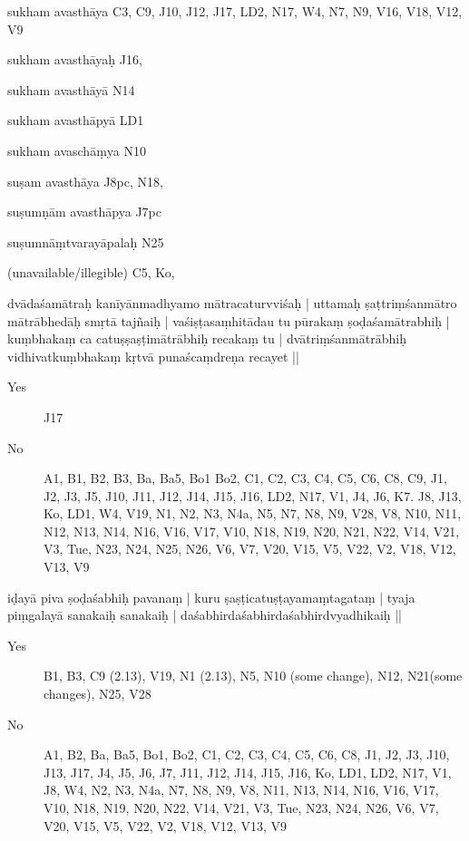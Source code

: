 \begin{ekdosis}
\begin{marma}[hp01_055]
\begin{marma}[hp02_006]
\item[sukham avasthāya] C3, C9, J10, J12, J17, LD2, N17, W4, N7, N9, V16, V18, V12, V9
\item[sukham avasthāyaḥ] J16,
\item[sukham avasthāyā] N14
\item[sukham avasthāpyā] LD1
\item[sukham avaschāṃya] N10
\item[suṣam avasthāya] J8pc, N18,
\item[suṣumṇām avasthāpya] J7pc
\item[suṣumnāṃtvarayāpalaḥ] N25
\item[(unavailable/illegible)] C5, Ko, 

 \begin{description}

        \end{description}
\end{marma}


\begin{marma}[hp02_009]
dvādaśamātraḥ kanīyānmadhyamo mātracaturvviśaḥ |
uttamaḥ ṣaṭtriṃśanmātro mātrābhedāḥ smṛtā tajñaiḥ |
vaśiṣṭasaṃhitādau tu pūrakaṃ ṣoḍaśamātrabhiḥ |
kuṃbhakaṃ ca catuṣṣaṣṭimātrābhiḥ recakaṃ tu |
dvātriṃśanmātrābhiḥ vidhivatkuṃbhakaṃ kṛtvā punaścaṃdreṇa recayet ||
\begin{description}
\item[Yes] J17
\item[No] A1, B1, B2, B3, Ba, Ba5, Bo1 Bo2, C1, C2, C3, C4, C5, C6, C8, C9, J1, J2, J3, J5, J10, J11, J12, J14, J15, J16, LD2, N17, V1, J4, J6, K7. J8, J13, Ko, LD1, W4, V19, N1, N2, N3, N4a, N5, N7, N8, N9, V28, V8, N10, N11, N12, N13, N14, N16, V16, V17, V10, N18, N19, N20, N21, N22, V14, V21, V3, Tue, N23, N24, N25, N26, V6, V7, V20, V15, V5, V22, V2, V18, V12, V13, V9
        \end{description}

\begin{marma}[hp02_011]
iḍayā piva ṣoḍaśabhiḥ pavanaṃ |
kuru ṣaṣṭicatuṣṭayamaṃtagataṃ |
tyaja piṃgalayā sanakaiḥ sanakaiḥ |
daśabhirdaśabhirdaśabhirdvyadhikaiḥ ||
\begin{description}
\item[Yes] B1, B3, C9 (2.13), V19, N1 (2.13), N5, N10 (some change), N12, N21(some changes), N25, V28
\item[No] A1, B2, Ba, Ba5, Bo1, Bo2, C1, C2, C3, C4, C5, C6, C8, J1, J2, J3, J10, J13, J17, J4, J5, J6, J7, J11, J12, J14, J15, J16, Ko, LD1, LD2, N17, V1, J8, W4, N2, N3, N4a, N7, N8, N9, V8, N11, N13, N14, N16, V16, V17, V10, N18, N19, N20, N22, V14, V21, V3, Tue, N23, N24, N26, V6, V7, V20, V15, V5, V22, V2, V18, V12, V13, V9
        \end{description}



\end{marma}
\end{marma}
\end{marma}
\end{ekdosis}

